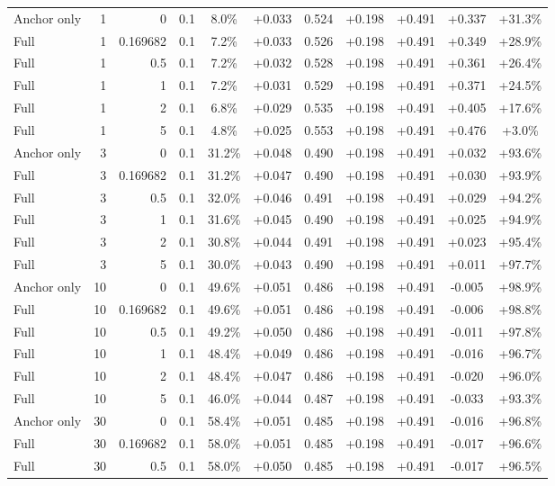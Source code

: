 \begin{table}[htbp]
\begin{tabular}{lrrrccccccc}
Anchor only & 1 & 0 & 0.1 & 8.0\% & +0.033 & 0.524 & +0.198 & +0.491 & +0.337 & +31.3\% \\
Full & 1 & 0.169682 & 0.1 & 7.2\% & +0.033 & 0.526 & +0.198 & +0.491 & +0.349 & +28.9\% \\
Full & 1 & 0.5 & 0.1 & 7.2\% & +0.032 & 0.528 & +0.198 & +0.491 & +0.361 & +26.4\% \\
Full & 1 & 1 & 0.1 & 7.2\% & +0.031 & 0.529 & +0.198 & +0.491 & +0.371 & +24.5\% \\
Full & 1 & 2 & 0.1 & 6.8\% & +0.029 & 0.535 & +0.198 & +0.491 & +0.405 & +17.6\% \\
Full & 1 & 5 & 0.1 & 4.8\% & +0.025 & 0.553 & +0.198 & +0.491 & +0.476 & +3.0\% \\
Anchor only & 3 & 0 & 0.1 & 31.2\% & +0.048 & 0.490 & +0.198 & +0.491 & +0.032 & +93.6\% \\
Full & 3 & 0.169682 & 0.1 & 31.2\% & +0.047 & 0.490 & +0.198 & +0.491 & +0.030 & +93.9\% \\
Full & 3 & 0.5 & 0.1 & 32.0\% & +0.046 & 0.491 & +0.198 & +0.491 & +0.029 & +94.2\% \\
Full & 3 & 1 & 0.1 & 31.6\% & +0.045 & 0.490 & +0.198 & +0.491 & +0.025 & +94.9\% \\
Full & 3 & 2 & 0.1 & 30.8\% & +0.044 & 0.491 & +0.198 & +0.491 & +0.023 & +95.4\% \\
Full & 3 & 5 & 0.1 & 30.0\% & +0.043 & 0.490 & +0.198 & +0.491 & +0.011 & +97.7\% \\
Anchor only & 10 & 0 & 0.1 & 49.6\% & +0.051 & 0.486 & +0.198 & +0.491 & -0.005 & +98.9\% \\
Full & 10 & 0.169682 & 0.1 & 49.6\% & +0.051 & 0.486 & +0.198 & +0.491 & -0.006 & +98.8\% \\
Full & 10 & 0.5 & 0.1 & 49.2\% & +0.050 & 0.486 & +0.198 & +0.491 & -0.011 & +97.8\% \\
Full & 10 & 1 & 0.1 & 48.4\% & +0.049 & 0.486 & +0.198 & +0.491 & -0.016 & +96.7\% \\
Full & 10 & 2 & 0.1 & 48.4\% & +0.047 & 0.486 & +0.198 & +0.491 & -0.020 & +96.0\% \\
Full & 10 & 5 & 0.1 & 46.0\% & +0.044 & 0.487 & +0.198 & +0.491 & -0.033 & +93.3\% \\
Anchor only & 30 & 0 & 0.1 & 58.4\% & +0.051 & 0.485 & +0.198 & +0.491 & -0.016 & +96.8\% \\
Full & 30 & 0.169682 & 0.1 & 58.0\% & +0.051 & 0.485 & +0.198 & +0.491 & -0.017 & +96.6\% \\
Full & 30 & 0.5 & 0.1 & 58.0\% & +0.050 & 0.485 & +0.198 & +0.491 & -0.017 & +96.5\% \\

\end{tabular}
\end{table}
